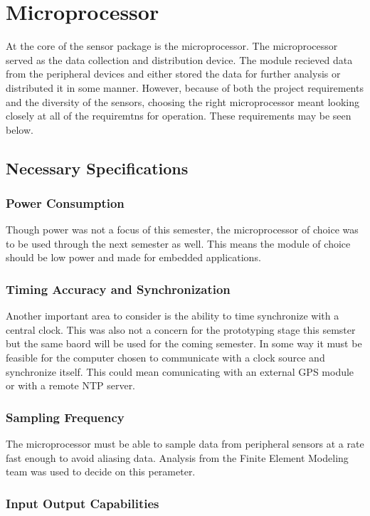 \section{Microprocessor}
\label{sec:uProcessor}
\indent At the core of the sensor package is the microprocessor. The microprocessor served as the data collection and distribution device. The module recieved data from the peripheral devices and either stored the data for further analysis or distributed it in some manner. However, because of both the project requirements and the diversity of the sensors, choosing the right microprocessor meant looking closely at all of the requiremtns for operation. These requirements may be seen below. 
\subsection{Necessary Specifications}
\subsubsection{Power Consumption}

\indent Though power was not a focus of this semester, the microprocessor of choice was to be used through the next semester as well. This means the module of choice should be low power and made for embedded applications. 

\subsubsection{Timing Accuracy and Synchronization}

\indent Another important area to consider is the ability to time synchronize with a central clock. This was also not a concern for the prototyping stage this semster but the same baord will be used for the coming semester. In some way it must be feasible for the computer chosen to communicate with a clock source and synchronize itself. This could mean comunicating with an external GPS module or with a remote NTP server. 
\subsubsection{Sampling Frequency}

The microprocessor must be able to sample data from peripheral sensors at a rate fast enough to avoid aliasing data. Analysis from the Finite Element Modeling team was used to decide on this perameter.

\subsubsection{Input Output Capabilities}

